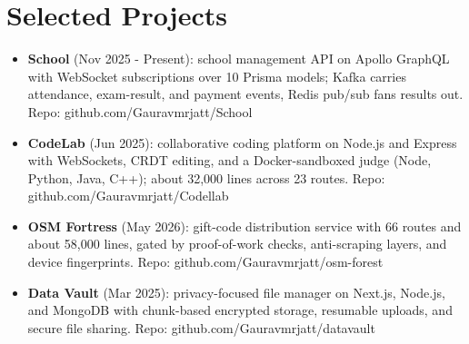 \documentclass[11pt,a4paper,sans]{moderncv}
\begin{document}
\vspace{2pt}



\section{Selected Projects}
\vspace{1pt}
\begin{itemize}
    \item {\textbf{School} (Nov 2025 - Present): school management API on Apollo GraphQL with WebSocket subscriptions over 10 Prisma models; Kafka carries attendance, exam-result, and payment events, Redis pub/sub fans results out. Repo: github.com/Gauravmrjatt/School}
    \item {\textbf{CodeLab} (Jun 2025): collaborative coding platform on Node.js and Express with WebSockets, CRDT editing, and a Docker-sandboxed judge (Node, Python, Java, C++); about 32,000 lines across 23 routes. Repo: github.com/Gauravmrjatt/Codellab}
    \item {\textbf{OSM Fortress} (May 2026): gift-code distribution service with 66 routes and about 58,000 lines, gated by proof-of-work checks, anti-scraping layers, and device fingerprints. Repo: github.com/Gauravmrjatt/osm-forest}
    \item {\textbf{Data Vault} (Mar 2025): privacy-focused file manager on Next.js, Node.js, and MongoDB with chunk-based encrypted storage, resumable uploads, and secure file sharing. Repo: github.com/Gauravmrjatt/datavault}
\end{itemize}
\end{document}
